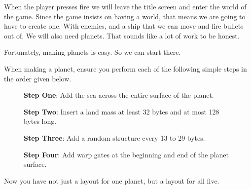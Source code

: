 When the player presses fire we will leave the title screen and enter the world of the game. Since the
game insists on having a world, that means we are going to have to create one. With enemies, and a ship
that we can move and fire bullets out of. We will also need planets. That sounds like a lot of work to be honest.

Fortunately, making planets is easy. So we can start there. 

When making a planet, ensure you perform each of the following
simple steps in the order given below.

\begin{figure}[H]
  {
    \begin{adjustbox}{width=10cm,center}
    \end{adjustbox}
  }\caption[]{\textbf{Step One}: Add the sea across the entire surface of the planet.}
\end{figure}

\begin{figure}[H]
  {
    \begin{adjustbox}{width=10cm,center}
    \end{adjustbox}
  }\caption[]{\textbf{Step Two}: Insert a land mass at least 32 bytes and at most 128 bytes long.}
\end{figure}

\begin{figure}[H]
  {
    \begin{adjustbox}{width=10cm,center}
    \end{adjustbox}
  }\caption[]{\textbf{Step Three}: Add a random structure every 13 to 29 bytes.}
\end{figure}

\begin{figure}[H]
  {
    \begin{adjustbox}{width=10cm,center}
    \end{adjustbox}
  }\caption[]{\textbf{Step Four}: Add warp gates at the beginning and end of the planet surface.}
\end{figure}

Now you have not just a layout for one planet, but a layout for all five.

